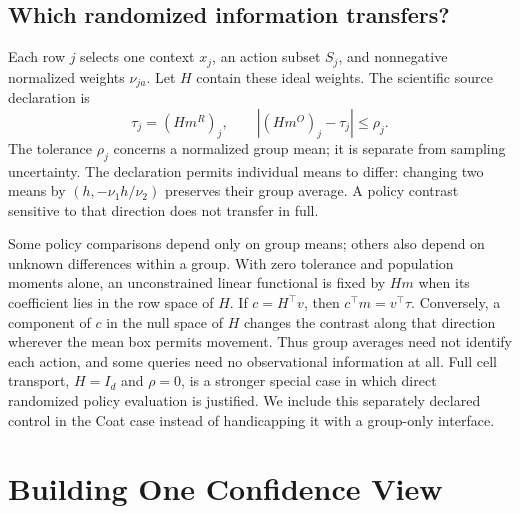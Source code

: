 \documentclass[conference]{IEEEtran}
\begin{document}
\subsection{Which randomized information transfers?}
Each row $j$ selects one context $x_j$, an action subset $S_j$, and nonnegative normalized weights $\nu_{ja}$. Let $H$ contain these ideal weights. The scientific source declaration is
\begin{equation}
 \tau_j=(Hm^R)_j,\qquad |(Hm^O)_j-\tau_j|\le\rho_j.\label{eq:transport}
\end{equation}
The tolerance $\rho_j$ concerns a normalized group mean; it is separate from sampling uncertainty. The declaration permits individual means to differ: changing two means by $(h,-\nu_1h/\nu_2)$ preserves their group average. A policy contrast sensitive to that direction does not transfer in full.

Some policy comparisons depend only on group means; others also depend on unknown differences within a group. With zero tolerance and population moments alone, an unconstrained linear functional is fixed by $Hm$ when its coefficient lies in the row space of $H$. If $c=H^\top v$, then $c^\top m=v^\top\tau$. Conversely, a component of $c$ in the null space of $H$ changes the contrast along that direction wherever the mean box permits movement. Thus group averages need not identify each action, and some queries need no observational information at all. Full cell transport, $H=I_d$ and $\rho=0$, is a stronger special case in which direct randomized policy evaluation is justified. We include this separately declared control in the Coat case instead of handicapping it with a group-only interface.

\section{Building One Confidence View}\label{sec:view}
\end{document}
